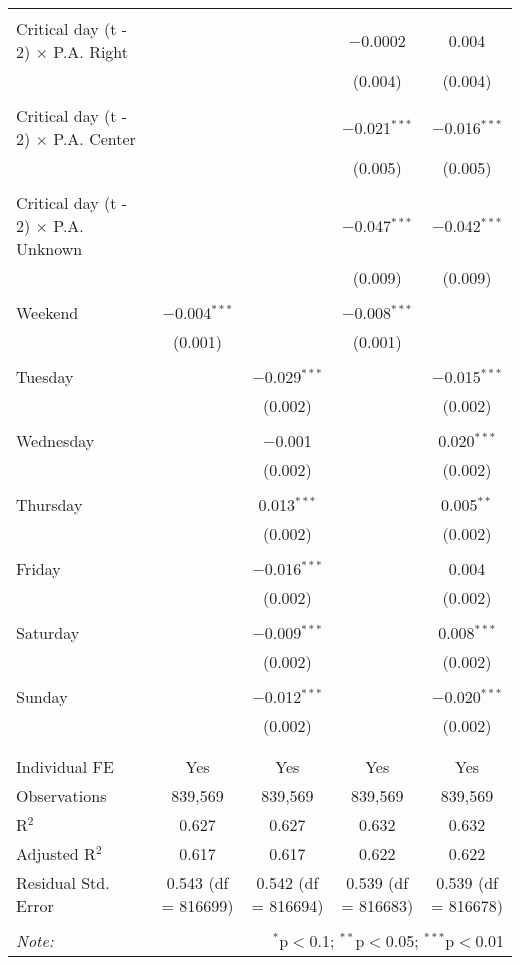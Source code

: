 \documentclass[
]{article}
\begin{document}
\begin{table}[!htbp]
{\begin{tabular}{@{\extracolsep{5pt}}lcccc}
  & & & & \\ 
 Critical day (t - 2) $\times$ P.A. Right &  &  & $-$0.0002 & 0.004 \\ 
  &  &  & (0.004) & (0.004) \\ 
  & & & & \\ 
 Critical day (t - 2) $\times$ P.A. Center &  &  & $-$0.021$^{***}$ & $-$0.016$^{***}$ \\ 
  &  &  & (0.005) & (0.005) \\ 
  & & & & \\ 
 Critical day (t - 2) $\times$ P.A. Unknown &  &  & $-$0.047$^{***}$ & $-$0.042$^{***}$ \\ 
  &  &  & (0.009) & (0.009) \\ 
  & & & & \\ 
 Weekend & $-$0.004$^{***}$ &  & $-$0.008$^{***}$ &  \\ 
  & (0.001) &  & (0.001) &  \\ 
  & & & & \\ 
 Tuesday &  & $-$0.029$^{***}$ &  & $-$0.015$^{***}$ \\ 
  &  & (0.002) &  & (0.002) \\ 
  & & & & \\ 
 Wednesday &  & $-$0.001 &  & 0.020$^{***}$ \\ 
  &  & (0.002) &  & (0.002) \\ 
  & & & & \\ 
 Thursday &  & 0.013$^{***}$ &  & 0.005$^{**}$ \\ 
  &  & (0.002) &  & (0.002) \\ 
  & & & & \\ 
 Friday &  & $-$0.016$^{***}$ &  & 0.004 \\ 
  &  & (0.002) &  & (0.002) \\ 
  & & & & \\ 
 Saturday &  & $-$0.009$^{***}$ &  & 0.008$^{***}$ \\ 
  &  & (0.002) &  & (0.002) \\ 
  & & & & \\ 
 Sunday &  & $-$0.012$^{***}$ &  & $-$0.020$^{***}$ \\ 
  &  & (0.002) &  & (0.002) \\ 
  & & & & \\ 
\hline \\[-1.8ex] 
Individual FE & Yes & Yes & Yes & Yes \\ 
Observations & 839,569 & 839,569 & 839,569 & 839,569 \\ 
R$^{2}$ & 0.627 & 0.627 & 0.632 & 0.632 \\ 
Adjusted R$^{2}$ & 0.617 & 0.617 & 0.622 & 0.622 \\ 
Residual Std. Error & 0.543 (df = 816699) & 0.542 (df = 816694) & 0.539 (df = 816683) & 0.539 (df = 816678) \\ 
\hline 
\hline \\[-1.8ex] 
\textit{Note:}  & \multicolumn{4}{r}{$^{*}$p$<$0.1; $^{**}$p$<$0.05; $^{***}$p$<$0.01} \\ 
\end{tabular}
} 
\end{table} 
\newpage
\end{document}

